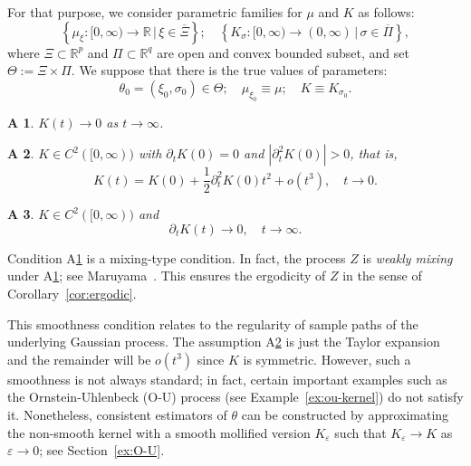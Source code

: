 \documentclass[a4paper,10pt,twoside]{article}
\newtheorem{asA}{A}
\numberwithin{equation}{section}
\def\R{\mathbb{R}}
\def\l{\left}
\def\r{\right}
\def\th{\theta}
\def\s{\sigma}
\def\p{\partial}
\def\ol#1{\overline{#1}}
\begin{document}
For that purpose, we consider parametric families for $\mu$ and $K$ as follows: 
\[
\l\{\mu_\xi:  [0,\infty) \to \R \,|\, \xi \in \ol{\Xi}\r\};\quad \l\{K_\s:[0,\infty) \to (0,\infty)\,|\, \s\in \ol{\Pi}\r\}, 
\]
where  $\Xi\subset \R^p$  and $\Pi\subset \R^q$ are open and convex bounded subset, and set $\Theta := \Xi \times \Pi$. 
We suppose that there is the true values of parameters: 
\[
\th_0=(\xi_0,\s_0) \in \Theta;\quad \mu_{\xi_0} \equiv \mu;\quad K \equiv K_{\s_0}. 
\]

\begin{asA}\label{as:2}
$K(t) \to 0$ as $t \to \infty$.
\end{asA}

\begin{asA}\label{as:3}
 $K \in C^2([0,\infty))$ with $\p_t K(0) = 0$ and $|\p_t^2 K(0)| > 0$, that is,
\[
K(t) = K(0) + \frac{1}{2} \p_t^2 K(0) t^2 + o(t^3), \quad t \to 0.
\]
\end{asA}

\begin{asA}\label{as:4}
$K \in C^2([0,\infty))$ and 
\[
\p_tK(t) \to 0,\quad t\to \infty. 
\]
\end{asA}
Condition A\ref{as:2} is a mixing-type condition. In fact, the process $Z$ is \textit{weakly mixing} under A\ref{as:2}; see Maruyama~\cite{m49}. This ensures the ergodicity of $Z$ in the sense of Corollary~\ref{cor:ergodic}.

This smoothness condition relates to the regularity of sample paths of the underlying Gaussian process. The assumption A\ref{as:3} is just the Taylor expansion and the remainder will be $o(t^3)$ since $K$ is symmetric. However, such a smoothness is not always standard; in fact, certain important examples such as the Ornstein-Uhlenbeck (O-U) process (see Example~\ref{ex:ou-kernel}) do not satisfy it. Nonetheless, consistent estimators of $\theta$ can be constructed by approximating the non-smooth kernel with a smooth mollified version $K_\varepsilon$ such that $K_\varepsilon \to K$ as $\varepsilon \to 0$; see Section~\ref{ex:O-U}.
\end{document}

